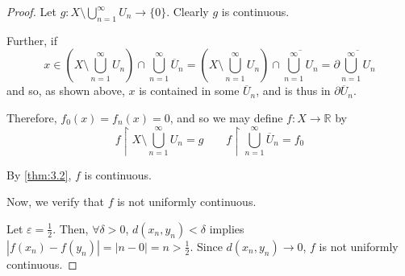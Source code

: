 \documentclass[openany, amssymb, psamsfonts]{amsart}
\let\fullref\autoref
\theoremstyle{definition}
\numberwithin{equation}{section}
\begin{document}
\begin{proof}
  Let $g: X \setminus \bigcup_{n=1}^\infty U_n \to \{0\}$. Clearly $g$ is continuous. 

  Further, if 
  $$x \in \left(X \setminus \bigcup_{n=1}^\infty U_n\right) \cap \bigcup_{n=1}^\infty \overline{U}_n = \left(X \setminus \bigcup_{n=1}^\infty U_n\right) \cap \overline{\bigcup_{n=1}^\infty U_n} = \partial\overline{\bigcup_{n=1}^\infty U_n}$$ and so, as shown above,  $x$ is contained in some $\overline{U}_n$, and is thus in $\partial\overline{U}_n$. 

  Therefore, $f_0(x) = f_n(x) = 0$, and so we may define $f: X \to \mathbb R$ by $$f\restriction X\setminus \bigcup_{n=1}^\infty U_n = g \qquad f\restriction \bigcup_{n=1}^\infty \overline{U}_n = f_0$$

  By \fullref{thm:3.2}, $f$ is continuous. 

  Now, we verify that $f$ is not uniformly continuous. 

  Let $\varepsilon = \frac12$. Then, $\forall \delta > 0$, $d(x_n, y_n) < \delta$ implies $|f(x_n) - f(y_n)| = |n - 0| = n > \frac12$. Since $d(x_n, y_n) \to 0$, $f$ is not uniformly continuous. 
\end{proof}
\end{document}
